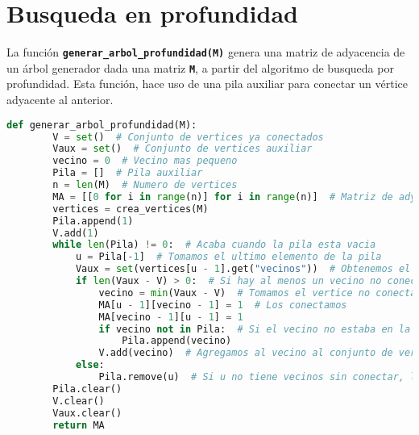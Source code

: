 \section{Busqueda en profundidad}
La función \texttt{\textbf{generar\_arbol\_profundidad(M)}} genera una matriz de adyacencia de un árbol generador dada una matriz \texttt{\textbf{M}}, a partir del algoritmo de busqueda por profundidad.
Esta función,  hace uso de una pila auxiliar para conectar un vértice adyacente al anterior.
\begin{lstlisting}[language=python, caption=Función generar\_arbol\_profundidad(M)]
    def generar_arbol_profundidad(M):
        V = set()  # Conjunto de vertices ya conectados
        Vaux = set()  # Conjunto de vertices auxiliar
        vecino = 0  # Vecino mas pequeno
        Pila = []  # Pila auxiliar
        n = len(M)  # Numero de vertices
        MA = [[0 for i in range(n)] for i in range(n)]  # Matriz de adyacencia
        vertices = crea_vertices(M)
        Pila.append(1)
        V.add(1)
        while len(Pila) != 0:  # Acaba cuando la pila esta vacia
            u = Pila[-1]  # Tomamos el ultimo elemento de la pila
            Vaux = set(vertices[u - 1].get("vecinos"))  # Obtenemos el conjunto de vertices no conectados a u
            if len(Vaux - V) > 0:  # Si hay al menos un vecino no conectado a u
                vecino = min(Vaux - V)  # Tomamos el vertice no conectado mas pequeno
                MA[u - 1][vecino - 1] = 1  # Los conectamos
                MA[vecino - 1][u - 1] = 1
                if vecino not in Pila:  # Si el vecino no estaba en la pila, lo agregamos
                    Pila.append(vecino)
                V.add(vecino)  # Agregamos al vecino al conjunto de vertices ya conectados
            else:
                Pila.remove(u)  # Si u no tiene vecinos sin conectar, lo quitamos de la pila
        Pila.clear()
        V.clear()
        Vaux.clear()
        return MA
\end{lstlisting}